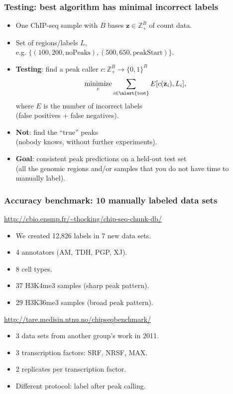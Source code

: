 \documentclass{beamer}
\DeclareMathOperator*{\minimize}{minimize}
\newcommand{\ZZ}{\mathbb Z}
\begin{document}
\begin{frame}
  \frametitle{Testing: best algorithm has minimal incorrect labels}
  \begin{itemize}
  \item One ChIP-seq sample with $B$ bases $\mathbf z
    \in\ZZ_+^{B}$ of count data.
  \item Set of regions/labels $L$,\\
    e.g. $\{(100, 200, \text{noPeaks}), (500, 650, \text{peakStart})\}$.
  \item \textbf{Testing}: find a peak caller $c:\ZZ_+^{B} \rightarrow
    \{0,1\}^{B}$ 
  \begin{equation*}
    \label{eq:min_test_err}
    \minimize_c \sum_{i\in\text{\alert{test}}} E[c(\mathbf z_i),  L_i],
  \end{equation*}
  where $E$ is the number of incorrect labels\\(false positives + false
  negatives).
\item \textbf{Not}: find the ``true'' peaks\\
  (nobody knows, without further experiments).
\item \textbf{Goal}: \alert{consistent peak predictions on a held-out
    test set\\ (all the genomic regions and/or samples that you do not
    have time to manually label).}
\end{itemize}
\end{frame}



\begin{frame}
  \frametitle{Accuracy benchmark: 10 manually labeled data sets}
  \url{http://cbio.ensmp.fr/~thocking/chip-seq-chunk-db/}
  \begin{itemize}
  \item We created 12,826 labels in 7 new data sets.
  \item 4 annotators (AM, TDH, PGP, XJ).
  \item 8 cell types.
  \item 37 H3K4me3 samples (sharp peak pattern).
  \item 29 H3K36me3 samples (broad peak pattern).
  \end{itemize}
  \vskip 1cm
  \url{http://tare.medisin.ntnu.no/chipseqbenchmark/}
  \begin{itemize}
  \item 3 data sets from another group's work in 2011.
  \item 3 transcription factors: SRF, NRSF, MAX.
  \item 2 replicates per transcription factor.
  \item Different protocol: label after peak calling.
  \end{itemize}
\end{frame}
\end{document}
